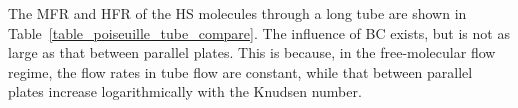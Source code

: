 
The MFR and HFR of the HS molecules through a long tube are shown in Table~\ref{table_poiseuille_tube_compare}. The influence of BC exists, but is not as large as that between parallel plates. This is because, in the free-molecular flow regime, the flow rates in tube flow are constant, while that between parallel plates increase logarithmically with the Knudsen number. 
